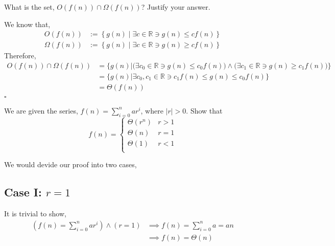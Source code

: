 \documentclass[addpoints]{exam}
\begin{document}
\begin{questions}
	\question[5] What is the set, $O(f(n)) \cap \Omega(f(n))$? Justify your answer.

	\begin{solution}
		We know that,
		\begin{equation*}
			\begin{aligned}
				O(f(n))      & := \left\{g(n) \mid \exists c\in\mathbb{R} \ni g(n) \leq cf(n) \right\} \\
				\Omega(f(n)) & := \left\{g(n) \mid \exists c\in\mathbb{R} \ni g(n) \geq cf(n) \right\}
			\end{aligned}
		\end{equation*}
		Therefore,
		\begin{equation*}
			\begin{aligned}
				O(f(n)) \cap \Omega(f(n)) & = \bigg\{g(n) \bigg| \bigg(\exists c_0\in\mathbb{R} \ni g(n) \leq c_0f(n)\bigg) \land \bigg(\exists c_1\in\mathbb{R} \ni g(n) \geq c_1f(n) \bigg) \bigg\} \\
				                          & = \bigg\{g(n) \bigg| \exists c_0,c_1\in\mathbb{R} \ni c_1f(n) \leq g(n) \leq c_0f(n) \bigg\}                                                              \\
				                          & = \Theta(f(n))                                                                                                                                            \\
			\end{aligned}
		\end{equation*}
		\hfill \(\square\)
	\end{solution}

	\question[5] We are given the series, $f(n) = \sum_{i=0}^nar^i$, where $|r|>0$. Show that
	\[
		f(n) =
		\begin{cases}
			\Theta(r^n) & r > 1 \\
			\Theta(n)   & r = 1 \\
			\Theta(1)   & r < 1 \\
		\end{cases}
	\]

	\begin{solution}
		We would devide our proof into two cases,
		\subsection*{Case I: \(r=1\)}
		It is trivial to show,
		\begin{equation}
			\begin{aligned}
				\left(f(n) = \sum_{i=0}^n ar^i\right) \land \left(r=1\right) & \implies f(n) = \sum_{i=0}^n a = an \\
				                                                             & \implies f(n)=\Theta(n)
			\end{aligned}
		\end{equation}


\end{solution}
\end{questions}
\end{document}
